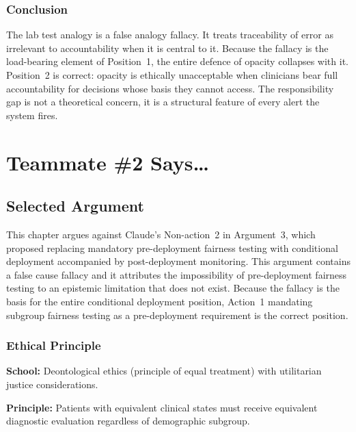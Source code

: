 \documentclass[]{UCD_CS_41820_Report}
\begin{document}
\subsection*{Conclusion}

The lab test analogy is a false analogy fallacy. It treats traceability of error as
irrelevant to accountability when it is central to it. Because the fallacy is the
load-bearing element of Position~1, the entire defence of opacity collapses with it.
Position~2 is correct: opacity is ethically unacceptable when clinicians bear full
accountability for decisions whose basis they cannot access. The responsibility gap
is not a theoretical concern, it is a structural feature of every alert the
system fires.

\chapter{Teammate \#2 Says\ldots}

\section*{Selected Argument}

This chapter argues against Claude's Non-action~2 in Argument~3, which proposed
replacing mandatory pre-deployment fairness testing with conditional deployment
accompanied by post-deployment monitoring. This argument contains a false cause
fallacy and it attributes the impossibility of pre-deployment fairness testing to
an epistemic limitation that does not exist. Because the fallacy is the basis for
the entire conditional deployment position, Action~1 mandating subgroup fairness
testing as a pre-deployment requirement is the correct position.

\subsection*{Ethical Principle}

\textbf{School:} Deontological ethics (principle of equal treatment) with
utilitarian justice considerations.

\textbf{Principle:}
Patients with equivalent clinical states must receive equivalent diagnostic
evaluation regardless of demographic subgroup.
\end{document}
